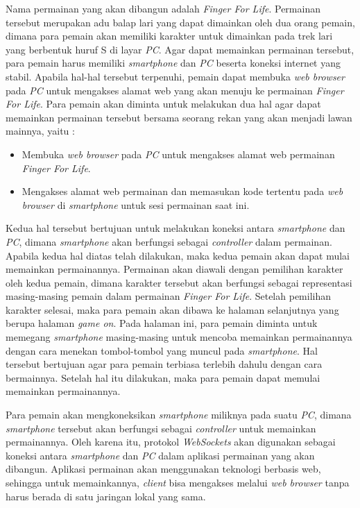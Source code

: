 \documentclass[a4paper,twoside]{article}
\begin{document}
\begin{enumerate}
		Nama permainan yang akan dibangun adalah \textit{Finger For Life}. Permainan tersebut merupakan adu balap lari yang dapat dimainkan oleh dua orang pemain, dimana para pemain akan memiliki karakter untuk dimainkan pada trek lari yang berbentuk huruf S di layar \textit{PC}. Agar dapat memainkan permainan tersebut, para pemain harus memiliki \textit{smartphone} dan \textit{PC} beserta koneksi internet yang stabil. Apabila hal-hal tersebut terpenuhi, pemain dapat membuka \textit{web browser} pada \textit{PC} untuk mengakses alamat web yang akan menuju ke permainan \textit{Finger For Life}. Para pemain akan diminta untuk melakukan dua hal agar dapat memainkan permainan tersebut bersama seorang rekan yang akan menjadi lawan mainnya, yaitu : 
		
		\begin{itemize}
			\item Membuka \textit{web browser} pada \textit{PC} untuk mengakses alamat web permainan \textit{Finger For Life}.
			\item Mengakses alamat web permainan dan memasukan kode tertentu pada \textit{web browser} di \textit{smartphone} untuk sesi permainan saat ini.
		\end{itemize}
		
		Kedua hal tersebut bertujuan untuk melakukan koneksi antara \textit{smartphone} dan \textit{PC}, dimana \textit{smartphone} akan berfungsi sebagai \textit{controller} dalam permainan. Apabila kedua hal diatas telah dilakukan, maka kedua pemain akan dapat mulai memainkan permainannya.  Permainan akan diawali dengan pemilihan karakter oleh kedua pemain, dimana karakter tersebut akan berfungsi sebagai representasi masing-masing pemain dalam permainan \textit{Finger For Life}. Setelah pemilihan karakter selesai, maka para pemain akan dibawa ke halaman selanjutnya yang berupa halaman \textit{game on}. Pada halaman ini, para pemain diminta untuk memegang \textit{smartphone} masing-masing untuk mencoba memainkan permainannya dengan cara menekan tombol-tombol yang muncul pada \textit{smartphone}. Hal tersebut bertujuan agar para pemain terbiasa terlebih dahulu dengan cara bermainnya. Setelah hal itu dilakukan, maka para pemain dapat memulai memainkan permainannya.
		
		Para pemain akan mengkoneksikan \textit{smartphone} miliknya pada suatu \textit{PC}, dimana \textit{smartphone} tersebut akan berfungsi sebagai \textit{controller} untuk memainkan permainannya. Oleh karena itu, protokol \textit{WebSockets} akan digunakan sebagai koneksi antara \textit{smartphone} dan \textit{PC} dalam aplikasi permainan yang akan dibangun. Aplikasi permainan akan menggunakan teknologi berbasis web, sehingga untuk memainkannya, \textit{client} bisa mengakses melalui \textit{web browser} tanpa harus berada di satu jaringan lokal yang sama.


\end{enumerate}
\end{document}
